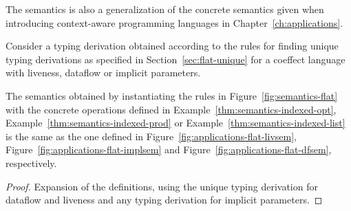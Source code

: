 The semantics is also a generalization of the concrete semantics given when introducing
context-aware programming languages in Chapter~\ref{ch:applications}.

\begin{theorem}[Generalization]
\label{thm:flat-generalization}

Consider a typing derivation obtained according to the rules for finding unique typing derivations
as specified in Section~\ref{sec:flat-unique} for a coeffect language with liveness, dataflow or
implicit parameters.

The semantics obtained by instantiating the rules in Figure~\ref{fig:semantics-flat} with the
concrete operations defined in Example~\ref{thm:semantics-indexed-opt},
Example~\ref{thm:semantics-indexed-prod} or Example~\ref{thm:semantics-indexed-list} is the
same as the one defined in Figure~\ref{fig:applications-flat-livsem},
Figure~\ref{fig:applications-flat-implsem} and Figure~\ref{fig:applications-flat-dfsem},
respectively.
\end{theorem}
\begin{proof}
Expansion of the definitions, using the unique typing derivation
for dataflow and liveness and any typing derivation for implicit parameters.
\end{proof}


%
%


